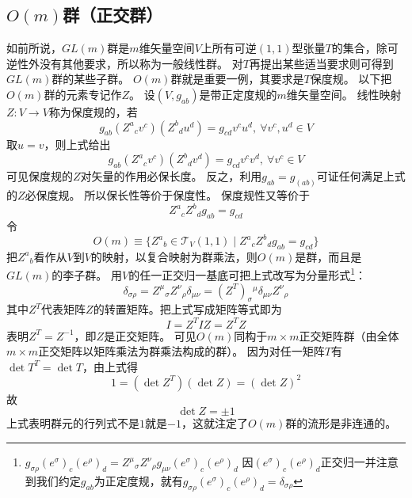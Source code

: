 \subsection{$O(m)$群（正交群）}

如前所说，$GL(m)$群是$m$维矢量空间$V$上所有可逆$(1, 1)$型张量$T$的集合，除可逆性外没有其他要求，所以称为一般线性群。
对$T$再提出某些适当要求则可得到$GL(m)$群的某些子群。
$O(m)$群就是重要一例，其要求是$T$保度规。
以下把$O(m)$群的元素专记作$Z$。
设$(V, g_{ab})$是带正定度规的$m$维矢量空间。
线性映射$Z \colon V \to V$称为保度规的，若
$$g_{ab}(Z^a{}_cv^c)(Z^b{}_du^d) = g_{cd}v^cu^d, ~ \forall v^c, u^d \in V$$
取$u = v$，则上式给出
$$g_{ab}(Z^a{}_cv^c)(Z^b{}_dv^d) = g_{cd}v^cv^d, ~ \forall v^c \in V$$
可见保度规的$Z$对矢量的作用必保长度。
反之，利用$g_{ab} = g_{(ab)}$可证任何满足上式的$Z$必保度规。
所以保长性等价于保度性。
保度规性又等价于
$$Z^a{}_cZ^b{}_dg_{ab} = g_{cd}$$
令$$O(m) \equiv \{Z^a{}_b \in \mathscr{T}_V(1, 1) \mid Z^a{}_cZ^b{}_dg_{ab} = g_{cd}\}$$
把$Z^a{}_b$看作从$V$到$V$的映射，以复合映射为群乘法，则$O(m)$是群，而且是$GL(m)$的李子群。
用$V$的任一正交归一基底可把上式改写为分量形式\footnote{
    $g_{\sigma\rho}(e^\sigma)_c(e^\rho)_d = Z^\mu{}_\sigma Z^\nu{}_\rho g_{\mu\nu}(e^\sigma)_c(e^\rho)_d$
    因$(e^\sigma)_c(e^\rho)_d$正交归一并注意到我们约定$g_{ab}$为正定度规，就有$g_{\sigma\rho}(e^\sigma)_c(e^\rho)_d = \delta_{\sigma\rho}$
}：$$\delta_{\sigma\rho} = Z^\mu{}_\sigma Z^\nu{}_\rho \delta_{\mu\nu} = (Z^T)_\sigma{}^\mu \delta_{\mu\nu}Z^\nu{}_\rho$$
其中$Z^T$代表矩阵$Z$的转置矩阵。把上式写成矩阵等式即为
$$I = Z^TIZ = Z^TZ$$
表明$Z^T = Z^{-1}$，即$Z$是正交矩阵。
可见$O(m)$同构于$m \times m$正交矩阵群（由全体$m \times m$正交矩阵以矩阵乘法为群乘法构成的群）。
因为对任一矩阵$T$有$\det T^T = \det T$，由上式得
$$1 = (\det Z^T)(\det Z) = (\det Z)^2$$
故$$\det Z = \pm 1$$
上式表明群元的行列式不是$1$就是$-1$，这就注定了$O(m)$群的流形是非连通的。

